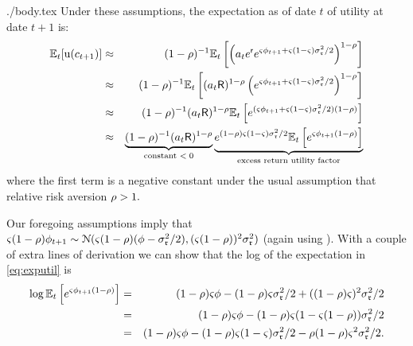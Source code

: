\documentclass{bejournal}
\begin{document}
\begin{verbatimwrite}{./body.tex}
Under these assumptions, the expectation as of date $t$ of utility at date $t+1$
is:
\begin{eqnarray}
  \mathbb{E}_{t}[{\mathrm{u}}(c_{t+1})] & \approx & (1-\rho)^{-1}\mathbb{E}_{t}\left[\left(a_{t}e^{\mathsf{r}}e^{{\varsigma} \phi_{t+1}+{\varsigma}(1-{\varsigma})\sigma^{2}_{\mathfrak{r}}/2 }\right)^{1-\rho}\right] \notag
\\                      & \approx & (1-\rho)^{-1}\mathbb{E}_{t}\left[(a_{t}\mathsf{R})^{1-\rho}\left( e^{{\varsigma} \phi_{t+1}+{\varsigma}(1-{\varsigma})\sigma^{2}_{\mathfrak{r}}/2 }\right)^{1-\rho}\right] \notag
\\                      & \approx & (1-\rho)^{-1}(a_{t}\mathsf{R})^{1-\rho}\mathbb{E}_{t}\left[e^{({\varsigma} \phi_{t+1}+{\varsigma}(1-{\varsigma})\sigma^{2}_{\mathfrak{r}}/2)  (1-\rho)}\right] \notag
\\                      & \approx & \underbrace{(1-\rho)^{-1}(a_{t}\mathsf{R})^{1-\rho}}_{\text{constant $< 0$}}\underbrace{e^{ (1-\rho){\varsigma}(1-{\varsigma})\sigma^{2}_{\mathfrak{r}}/2}\mathbb{E}_{t}\left[e^{{\varsigma} \phi_{t+1}  (1-\rho)}\right]}_{\text{excess return utility factor}}
 \label{eq:exputil}
  \end{eqnarray}
where the first term is a negative constant under the usual assumption that relative risk aversion $\rho>1.$

  Our foregoing assumptions imply that ${\varsigma} (1-\rho) \phi_{t+1}
   \sim \mathcal{N}({\varsigma} (1-\rho)(\phi -
  \sigma_{\mathfrak{r}}^{2}/2),({\varsigma}(1-\rho))^{2}\sigma_{\mathfrak{r}}^{2})$ (again using 
  ).  With a couple of extra
  lines of derivation we can show that the log of the expectation in \eqref{eq:exputil} is
\begin{eqnarray}
  \log \mathbb{E}_{t}\left[e^{{\varsigma} \phi_{t+1}  (1-\rho)}\right] & = & {(1-\rho){\varsigma} \phi-(1-\rho){\varsigma}\sigma_{\mathfrak{r}}^{2}/2+ ((1-\rho){\varsigma})^{2}\sigma_{\mathfrak{r}}^{2}/2} \notag
\\  & = & {(1-\rho){\varsigma} \phi-(1-\rho){\varsigma}(1-{\varsigma}(1-\rho))\sigma_{\mathfrak{r}}^{2}/2} \notag
\\  & = & {(1-\rho){\varsigma} \phi-(1-\rho){\varsigma}(1-{\varsigma})\sigma_{\mathfrak{r}}^{2}/2-\rho (1-\rho){\varsigma}^{2}\sigma_{\mathfrak{r}}^{2}/2}. \label{eq:Ex}
\end{eqnarray}


\end{verbatimwrite}
\end{document}
